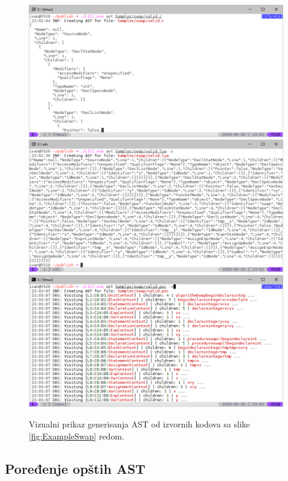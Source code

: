 \begin{figure}[h!]
\centering
\includegraphics[scale=0.56]{images/eval/ast_c.png}
\includegraphics[scale=0.56]{images/eval/ast_lua.png}
\includegraphics[scale=0.56]{images/eval/ast_psc.png}
\caption{Vizualni prikaz generisanja AST od izvornih kodova sa slike \ref{fig:ExampleSwap} redom.}
\label{fig:ExampleSwapAST}
\end{figure}


\subsection{Poređenje opštih AST}
\label{subsec:ImplementationExampleComparer}


